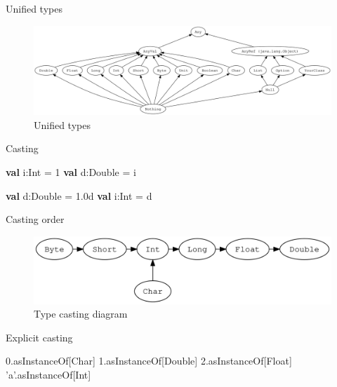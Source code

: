 \documentclass[ignorenonframetext,]{beamer}
\newenvironment{Shaded}{\begin{snugshade}}{\end{snugshade}}
\newcommand{\KeywordTok}[1]{\textcolor[rgb]{0.13,0.29,0.53}{\textbf{#1}}}
\newcommand{\DecValTok}[1]{\textcolor[rgb]{0.00,0.00,0.81}{#1}}
\newcommand{\FloatTok}[1]{\textcolor[rgb]{0.00,0.00,0.81}{#1}}
\newcommand{\CharTok}[1]{\textcolor[rgb]{0.31,0.60,0.02}{#1}}
\newcommand{\FunctionTok}[1]{\textcolor[rgb]{0.00,0.00,0.00}{#1}}
\newcommand{\NormalTok}[1]{#1}
\begin{document}
\begin{frame}[fragile]
\begin{block}{Unified types}
\begin{figure}
\centering
\includegraphics[width=8.33333in]{unified-types-diagram.svg}
\caption{Unified types}
\end{figure}

\end{block}

\begin{block}{Casting}

\begin{Shaded}
\begin{Highlighting}[]
\KeywordTok{val}\NormalTok{ i:Int = }\DecValTok{1}
\KeywordTok{val}\NormalTok{ d:Double = i}
\end{Highlighting}
\end{Shaded}

\begin{Shaded}
\begin{Highlighting}[]
\KeywordTok{val}\NormalTok{ d:Double = }\FloatTok{1.0}\NormalTok{d}
\KeywordTok{val}\NormalTok{ i:Int = d}
\end{Highlighting}
\end{Shaded}

\end{block}

\begin{block}{Casting order}

\begin{figure}
\centering
\includegraphics{type-casting-diagram.svg}
\caption{Type casting diagram}
\end{figure}

\end{block}

\begin{block}{Explicit casting}

\begin{Shaded}
\begin{Highlighting}[]
\FloatTok{0.}\NormalTok{asInstanceOf[Char]}
\FloatTok{1.}\NormalTok{asInstanceOf[Double]}
\FloatTok{2.}\NormalTok{asInstanceOf[Float]}
\CharTok{'a'}\NormalTok{.}\FunctionTok{asInstanceOf}\NormalTok{[Int]}
\end{Highlighting}
\end{Shaded}


\end{block}
\end{frame}
\end{document}
